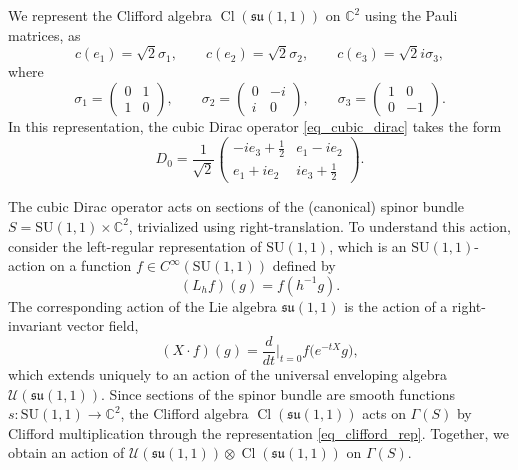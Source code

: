 \documentclass{amsart}
\theoremstyle{definition}
\theoremstyle{remark}
\DeclareMathOperator{\Cl}{Cl}
\numberwithin{equation}{section}
\begin{document}
We represent the Clifford algebra $\Cl(\mathfrak{su}(1,1))$ on $\mathbb{C}^2$ using the Pauli matrices, as
\begin{equation}\label{eq_clifford_rep}
    c(e_1)=\sqrt{2}\sigma_1,\qquad c(e_2)=\sqrt{2}\sigma_2,\qquad c(e_3)=\sqrt{2}i\sigma_3,
\end{equation}
where
\begin{equation}\label{eq_pauli_matrices}
    \sigma_1=\begin{pmatrix} 0 & 1 \\ 1 & 0 \end{pmatrix},\qquad \sigma_2=\begin{pmatrix} 0 & -i \\ i & 0 \end{pmatrix},\qquad \sigma_3=\begin{pmatrix} 1 & 0 \\ 0 & -1\end{pmatrix}.
\end{equation}
In this representation, the cubic Dirac operator \eqref{eq_cubic_dirac} takes the form
\begin{equation}\label{eq_cubic_dirac_rep}
    D_0=\frac{1}{\sqrt{2}}
    \begin{pmatrix} 
    -ie_3+\tfrac{1}{2} & e_1-ie_2 \\ 
    e_1+ie_2 & ie_3+\tfrac{1}{2} 
    \end{pmatrix}.
\end{equation}

The cubic Dirac operator acts on sections of the (canonical) spinor bundle $S=\mathrm{SU}(1,1)\times \mathbb{C}^2$, trivialized using right-translation. To understand this action, consider the left-regular representation of $\mathrm{SU}(1,1)$, which is an $\mathrm{SU}(1,1)$-action on a function $f\in C^\infty(\mathrm{SU}(1,1))$ defined by
\begin{equation*}
    (L_hf)(g)=f(h^{-1}g).
\end{equation*}
The corresponding action of the Lie algebra $\mathfrak{su}(1,1)$ is the action of a right-invariant vector field,  
\begin{equation*}
    (X\cdot f)(g)=\frac{d}{dt}\bigg|_{t=0}f\big(e^{-tX}g\big),
\end{equation*}
which extends uniquely to an action of the universal enveloping algebra $\mathcal{U}(\mathfrak{su}(1,1))$. Since sections of the spinor bundle are smooth functions $s\colon\mathrm{SU}(1,1)\rightarrow\mathbb{C}^2$, the Clifford algebra $\Cl(\mathfrak{su}(1,1))$ acts on $\Gamma(S)$ by Clifford multiplication through the representation \eqref{eq_clifford_rep}. Together, we obtain an action of $\mathcal{U}(\mathfrak{su}(1,1))\otimes\Cl(\mathfrak{su}(1,1))$ on $\Gamma(S)$.
\end{document}
